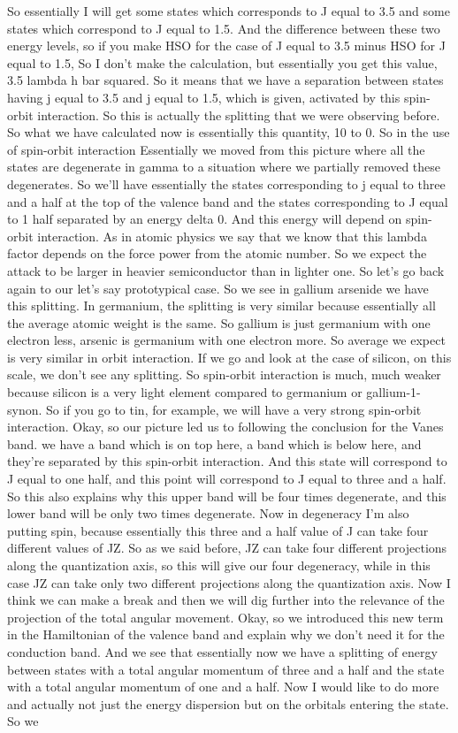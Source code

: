 So essentially I will get some states which corresponds to J equal to 3.5 and some states which correspond to J equal to 1.5. And the difference between these two energy levels, so if you make HSO for the case of J equal to 3.5 minus HSO for J equal to 1.5, So I don't make the calculation, but essentially you get this value, 3.5 lambda h bar squared. So it means that we have a separation between states having j equal to 3.5 and j equal to 1.5, which is given, activated by this spin-orbit interaction. So this is actually the splitting that we were observing before. So what we have calculated now is essentially this quantity, 10 to 0. So in the use of spin-orbit interaction Essentially we moved from this picture where all the states are degenerate in gamma to a situation where we partially removed these degenerates. So we'll have essentially the states corresponding to j equal to three and a half at the top of the valence band and the states corresponding to J equal to 1 half separated by an energy delta 0. And this energy will depend on spin-orbit interaction. As in atomic physics we say that we know that this lambda factor depends on the force power from the atomic number. So we expect the attack to be larger in heavier semiconductor than in lighter one. So let's go back again to our let's say prototypical case. So we see in gallium arsenide we have this splitting. In germanium, the splitting is very similar because essentially all the average atomic weight is the same. So gallium is just germanium with one electron less, arsenic is germanium with one electron more. So average we expect is very similar in orbit interaction. If we go and look at the case of silicon, on this scale, we don't see any splitting. So spin-orbit interaction is much, much weaker because silicon is a very light element compared to germanium or gallium-1-synon. So if you go to tin, for example, we will have a very strong spin-orbit interaction. Okay, so our picture led us to following the conclusion for the Vanes band. we have a band which is on top here, a band which is below here, and they're separated by this spin-orbit interaction. And this state will correspond to J equal to one half, and this point will correspond to J equal to three and a half. So this also explains why this upper band will be four times degenerate, and this lower band will be only two times degenerate. Now in degeneracy I'm also putting spin, because essentially this three and a half value of J can take four different values of JZ. So as we said before, JZ can take four different projections along the quantization axis, so this will give our four degeneracy, while in this case JZ can take only two different projections along the quantization axis. Now I think we can make a break and then we will dig further into the relevance of the projection of the total angular movement. Okay, so we introduced this new term in the Hamiltonian of the valence band and explain why we don't need it for the conduction band. And we see that essentially now we have a splitting of energy between states with a total angular momentum of three and a half and the state with a total angular momentum of one and a half. Now I would like to do more and actually not just the energy dispersion but on the orbitals entering the state. So we 